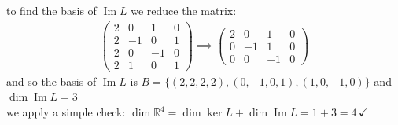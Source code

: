 \documentclass[a4paper,12pt]{article}
\DeclareMathOperator{\img}{Im}
\begin{document}
\begin{definition}
\begin{question}
\begin{subquestion}
\begin{answer}
\begin{step}
to find the basis of \(\img L\) we reduce the matrix:\\
\begin{gather*}
  \begin{pmatrix} 2 & 0 & 1 & 0\\ 2 & -1 & 0 & 1\\ 2 & 0 & -1 & 0\\ 2 & 1 & 0 & 1 \end{pmatrix} \implies \begin{pmatrix} 2 & 0 & 1 & 0\\ 0 & -1 & 1 & 0\\ 0 & 0 & -1 & 0 \end{pmatrix}
\end{gather*}
and so the basis of \(\img L\) is \(B = \{(2,2,2,2),(0,-1,0,1),(1,0,-1,0)\}\) and \(\dim\img L = 3\)\\
we apply a simple check: \(\dim\mathbb{R}^4 = \dim\ker L + \dim\img L = 1 + 3 = 4 \,\checkmark\)\\
\end{step}
\end{answer}
\end{subquestion}
\end{question}


\end{definition}
\end{document}
